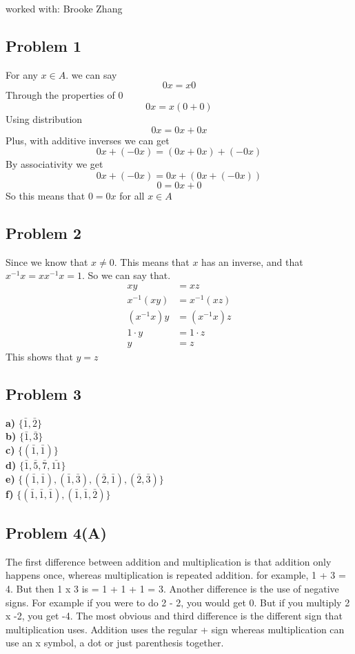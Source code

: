 \documentclass[12pt]{article}
\begin{document}
worked with: Brooke Zhang
\subsection*{Problem 1}
For any $x \in A$. we can say 
\[ 0x = x0 \]
Through the properties of 0
\[ 0x = x(0 + 0) \]
Using distribution
\[ 0x = 0x + 0x \]
Plus, with additive inverses we can get 
\[ 0x + (-0x) = (0x + 0x) + (-0x) \]
By associativity we get
\[ 0x + (-0x) = 0x + (0x + (-0x)) \]
\[ 0 = 0x + 0 \]
So this means that $0 = 0x$ for all $x \in A$
\subsection*{Problem 2}
Since we know that $x \neq 0$. This means that $x$ has an inverse, and that $x^{-1}x = xx^{-1}x = 1$. So we can say that.
\begin{align*}
xy &= xz\\
x^{-1}(xy) &= x^{-1}(xz)\\
(x^{-1}x)y &= (x^{-1}x)z\\
1 \cdot y &= 1 \cdot z\\
 y &= z
\end{align*}
This shows that $y = z$
\subsection*{Problem 3}
\textbf{a) } $\{\bar{ 1 }, \bar{ 2 }\}$\\
\textbf{b) } $\{\bar{ 1 }, \bar{ 3 }\}$\\
\textbf{c) } $ \{ (\bar{1}, \bar{1}) \} $\\
\textbf{d) } $ \{ \bar{1}, \bar{5}, \bar{7}, \bar{11} \} $\\
\textbf{e) } $\{ (\bar{1}, \bar{1}), (\bar{1}, \bar{3}), (\bar{2}, \bar{1}), (\bar{2}, \bar{3}) \}$\\
\textbf{f) } $\{ (\bar{1}, \bar{1}, \bar{1}), (\bar{1}, \bar{1}, \bar{2})  \}$\\
\subsection*{Problem 4(A)}
The first difference between addition and multiplication is that addition only happens once, whereas multiplication is repeated addition. for example, 1 + 3 = 4. But then 1 x 3 is = 1 + 1 + 1 = 3. Another difference is the use of negative signs. For example if you were to do 2 - 2, you would get 0. But if you multiply 2 x -2, you get -4. The most obvious and third difference is the different sign that multiplication uses. Addition uses the regular + sign whereas multiplication can use an x symbol, a dot or just parenthesis together.
\end{document}
